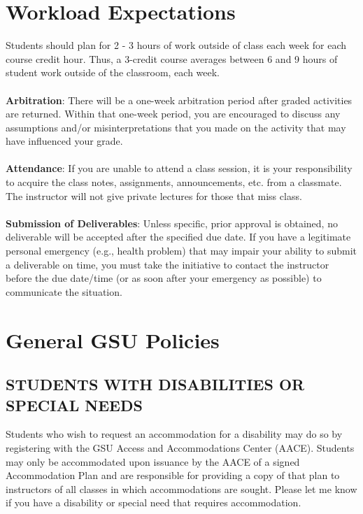 \documentclass{article}
\begin{document}
\section{Workload Expectations}
Students should plan for 2 - 3 hours of work outside of class each week for each course credit hour. Thus, a 3-credit course averages between 6 and 9 hours of student work outside of the classroom, each week.
\\
\\
\textbf{Arbitration}: There will be a one-week arbitration period after graded activities are returned. Within that one-week period, you are encouraged to discuss any assumptions and/or misinterpretations that you made on the activity that may have inﬂuenced your grade.
\\
\\
\textbf{Attendance}: If you are unable to attend a class session, it is your responsibility to acquire the class notes, assignments, announcements, etc. from a classmate. The instructor will not give private lectures for those that miss class.
\\
\\
\textbf{Submission of Deliverables}: Unless speciﬁc, prior approval is obtained, no deliverable will be accepted after the speciﬁed due date. If you have a legitimate personal emergency (e.g., health problem) that may impair your ability to submit a deliverable on time, you must take the initiative to contact the instructor before the due date/time (or as soon after your emergency as possible) to communicate the situation. 

\section{General GSU Policies}
\subsection{STUDENTS WITH DISABILITIES OR SPECIAL NEEDS}
Students who wish to request an accommodation for a disability may do so by registering with the GSU Access and Accommodations Center (AACE).   Students may only be accommodated upon issuance by the AACE of a signed Accommodation Plan and are responsible for providing a copy of that plan to instructors of all classes in which accommodations are sought.  Please let me know if you have a disability or special need that requires accommodation.
\end{document}
